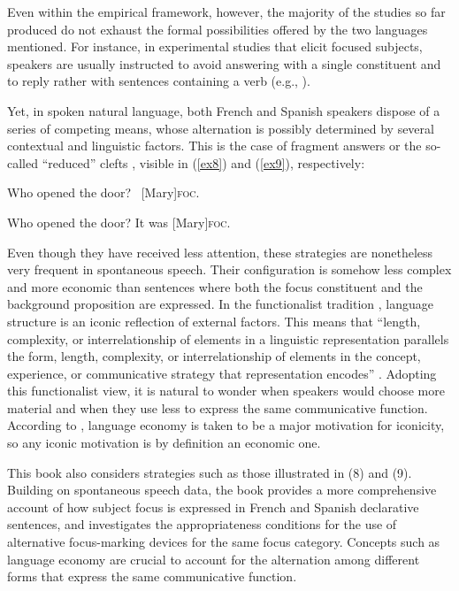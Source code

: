 Even within the empirical framework, however, the majority of the studies so far produced do not exhaust the formal possibilities offered by the two languages mentioned. For instance, in experimental studies that elicit focused subjects, speakers are usually instructed to avoid answering with a single constituent and to reply rather with sentences containing a verb (e.g., \cite{skopeteas2010focus}).

Yet, in spoken natural language, both French and Spanish speakers dispose of a series of competing means, whose alternation is possibly determined by several contextual and linguistic factors. This is the case of fragment answers \parencite{merchant2005fragments} or the so-called ``reduced” clefts \parencite{belletti2008answering, doetjes2004cleft, hedberg2000referential, buring1998identity, mikkelsen2012so}, visible in (\ref{ex8}) and (\ref{ex9}), respectively:

\ea \label{ex8}
\ea Who opened the door? 
\ex \ [Mary]\textsc{foc}\normalsize.
\z \z

\ea \label{ex9}
\ea Who opened the door? 
\ex It was [Mary]\textsc{foc}\normalsize.
\z \z


Even though they have received less attention, these strategies are nonetheless very frequent in spontaneous speech. Their configuration is somehow less complex and more economic than sentences where both the focus constituent and the background proposition are expressed. In the functionalist tradition \parencite{Givon1985, Givon1995, Haiman1985, macwhinney1989functionalism}, language structure is an iconic reflection of external factors. This means that ``length, complexity, or interrelationship of elements in a linguistic representation parallels the form, length, complexity, or interrelationship of elements in the concept, experience, or communicative strategy that representation encodes” \parencite[756]{newmeyer1992iconicity}. Adopting this functionalist view, it is natural to wonder when speakers would choose more material and when they use less to express the same communicative function.  According to \textcite{Givon1985}, language economy is taken to be a major motivation for iconicity, so any iconic motivation is by definition an economic one.

This book also considers strategies such as those illustrated in (8) and (9). Building on spontaneous speech data, the book provides a more comprehensive account of how subject focus is expressed in French and Spanish declarative sentences, and investigates the appropriateness conditions for the use of alternative focus-marking devices for the same focus category. Concepts such as language economy are crucial to account for the alternation among different forms that express the same communicative function.

